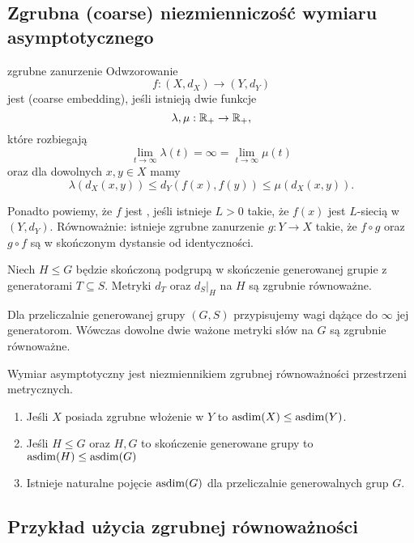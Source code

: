 \subsection{Zgrubna (coarse) niezmienniczość wymiaru asymptotycznego}

\begin{definition}{zgrubne zanurzenie}{}
  Odwzorowanie 
  $$f:(X, d_X)\to (Y, d_Y)$$ 
  jest  (coarse embedding), jeśli istnieją dwie funkcje 
  $$\lambda,\mu:\mathbb{R}_+\to \mathbb{R}_+,$$
  które rozbiegają
  $$\lim_{t\to\infty}\lambda(t)=\infty=\lim_{t\to\infty}\mu(t)$$
  oraz dla dowolnych $x,y\in X$ mamy
  $$\lambda(d_X(x,y))\leq d_Y(f(x),f(y))\leq \mu(d_X(x,y)).$$
\end{definition}

Ponadto powiemy, że $f$ jest , jeśli istnieje $L>0$ takie, że $f(x)$ jest $L$-siecią w $(Y, d_Y)$. Równoważnie: istnieje zgrubne zanurzenie $g:Y\to X$ takie, że $f\circ g$ oraz $g\circ f$ są w skończonym dystansie od identyczności.

\begin{example}[m]
  \item Niech $H\leq G$ będzie skończoną podgrupą w skończenie generowanej grupie z generatorami $T\subseteq S$. Metryki $d_T$ oraz $d_S|_H$ na $H$ są zgrubnie równoważne.
  \item Dla przeliczalnie generowanej grupy $(G,S)$ przypisujemy wagi dążące do $\infty$ jej generatorom. Wówczas dowolne dwie ważone metryki słów na $G$ są zgrubnie równoważne.
\end{example}

\begin{fact}{}{}
  Wymiar asymptotyczny jest niezmiennikiem zgrubnej równoważności przestrzeni metrycznych.
\end{fact}

\begin{enumerate}
  \item Jeśli $X$ posiada zgrubne włożenie w $Y$ to $\operatorname{asdim}(X)\leq\operatorname{asdim}(Y)$.
  \item Jeśli $H\leq G$ oraz $H,G$ to skończenie generowane grupy to $\operatorname{asdim}(H)\leq \operatorname{asdim}(G)$
  \item Istnieje naturalne pojęcie $\operatorname{asdim}(G)$ dla przeliczalnie generowalnych grup $G$.
\end{enumerate}

\subsection{Przykład użycia zgrubnej równoważności}

